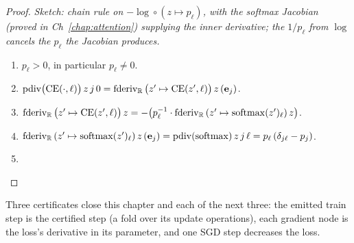\begin{proof}
\leanok
\emph{Sketch: chain rule on \(-\log \circ (z \mapsto p_\ell)\), with
the softmax Jacobian (proved in Ch~\ref{chap:attention}) supplying the
inner derivative; the \(1/p_\ell\) from \(\log\) cancels the
\(p_\ell\) the Jacobian produces.}
\begin{enumerate}
  \item \(p_\ell > 0\), in particular \(p_\ell \neq 0\).
  \item \(\operatorname{pdiv}\bigl(\mathrm{CE}(\cdot, \ell)\bigr)\, z\, j\, 0
          = \operatorname{fderiv}_{\mathbb{R}}\,\bigl(z' \mapsto \mathrm{CE}(z', \ell)\bigr)\, z\, (\mathbf{e}_j)\).
  \item \(\operatorname{fderiv}_{\mathbb{R}}\,\bigl(z' \mapsto \mathrm{CE}(z', \ell)\bigr)\, z
          = -\bigl(p_\ell^{-1} \cdot
            \operatorname{fderiv}_{\mathbb{R}}\,(z' \mapsto \mathrm{softmax}(z')_\ell)\, z\bigr)\).
  \item \(\operatorname{fderiv}_{\mathbb{R}}\,(z' \mapsto \mathrm{softmax}(z')_\ell)\, z\, (\mathbf{e}_j)
          = \operatorname{pdiv}(\mathrm{softmax})\, z\, j\, \ell
          = p_\ell\,(\delta_{j\ell} - p_j)\).
  \item \Qed{}
\end{enumerate}
\end{proof}

Three certificates close this chapter and each of the next three: the
emitted train step is the certified step (a fold over its update
operations), each gradient node is the loss's derivative in its parameter,
and one SGD step decreases the loss.

